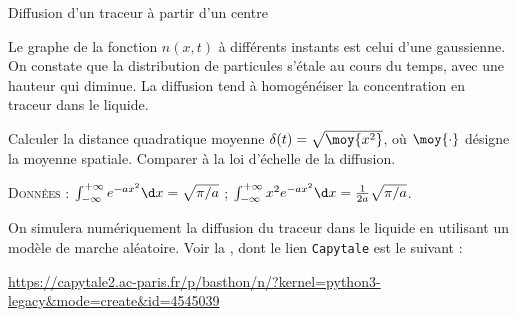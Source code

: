 \begin{exo}[PC][3][python]{Diffusion d’un traceur à partir d’un centre}
\begin{quest}
{      Le graphe de la fonction $n(x,t)$ à différents instants est celui d’une gaussienne. On constate que la distribution de particules s’étale au cours du temps, avec une hauteur qui diminue. La diffusion tend à homogénéiser la concentration en traceur dans le liquide.
    }
    \item Calculer la distance quadratique moyenne $\delta(t) = \sqrt{\moy{x^2}}$, où $\moy{\cdot}$ désigne la moyenne spatiale. Comparer à la loi d'échelle de la diffusion.
  \end{quest}

  \textsc{Données} : $\int_{-\infty}^{+\infty} e^{-a x^2} \d x = \sqrt{\pi/a}$ ; $\int_{-\infty}^{+\infty} x^2 e^{-a x^2} \d x = \frac{1}{2 a} \sqrt{\pi/a}$.

  On simulera numériquement la diffusion du traceur dans le liquide en utilisant un modèle de marche aléatoire. Voir la , dont le lien \texttt{Capytale} est le suivant :
  \begin{center}
    \href{https://capytale2.ac-paris.fr/p/basthon/n/?kernel=python3-legacy\&mode=create\&id=4545039}{https://capytale2.ac-paris.fr/p/basthon/n/?kernel=python3-legacy\&mode=create\&id=4545039}
  \end{center}
  
\end{exo}

